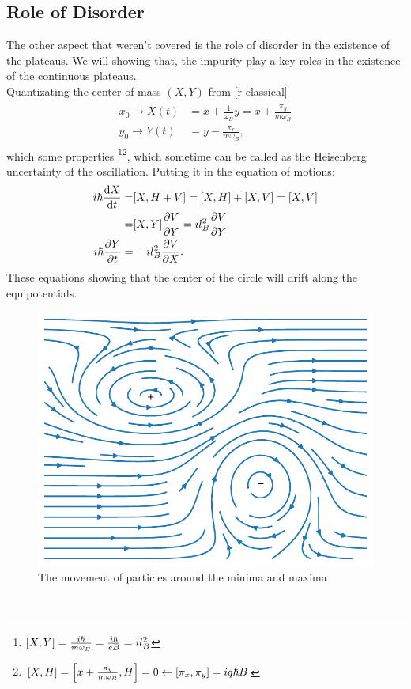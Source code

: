 \documentclass[unnumsec,webpdf,modern,large]{mam-authoring-template}%
\theoremstyle{thmstyleone}%
\theoremstyle{thmstyletwo}%
\theoremstyle{thmstylethree}%
\begin{document}
\subsection{Role of Disorder}
\quad The other aspect that weren't covered is the role of disorder in the existence of the plateaus. We will showing that, the impurity play a key roles in the existence of the continuous plateaus. \\\null\quad Quantizating the center of mass \((X,Y)\) from \eqref{r classical}
\begin{align}\label{X,Y or. def}
	\begin{split}
x_0 \to X(t) &= x + \frac{1}{\omega_B} \dot{y} = x+ \frac{\pi_y}{m \omega_B}\\
y_0 \to Y(t) &= y- \frac{\pi_x}{m \omega_B},
	\end{split}
\end{align}
\quad which some properties \footnote{\(\comm{X}{Y} = \frac{i\hbar}{m\omega_B} = \frac{i\hbar}{eB} = il_B^2\)}\footnote{\(\comm{X}{H} = \comm{x + \frac{\pi_y}{m\omega_B}}{H} = 0 \leftarrow \comm{\pi_x}{\pi_y} = iq\hbar B\)}, which sometime can be called as the Heisenberg uncertainty of the oscillation. Putting it in the equation of motions:
\begin{equation}\label{center of mass}
	\begin{split}
		i\hbar \dv{X}{t} =& \comm{X}{H + V} = \comm{X}{H} + \comm{X}{V} = [X,V]\nonumber\\
		=&[X,Y] \pdv{V}{Y}= i l_B^2 \pdv{V}{Y}\\
		i\hbar \pdv{Y}{t} =& -il_B^2 \pdv{V}{X}.
	\end{split}
\end{equation}
\quad These equations showing that the center of the circle will drift along the equipotentials.\\\null\quad
\begin{figure}[!h]
\centering
\includegraphics[width = 0.9\linewidth]{images/Disorder.pdf}
\caption{The movement of particles around the minima and maxima}
\label{Disorder}
\end{figure}\\\null
\end{document}

